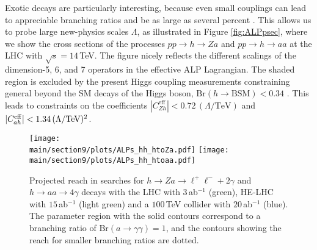 Exotic decays are particularly interesting, because even small couplings can lead to appreciable branching ratios and be as large as several percent \cite{Bauer:2017nlg, Bauer:2017ris}. 
This allows us to probe large new-physics scales $\Lambda$, as illustrated in Figure \ref{fig:ALPpsec}, where we show the cross sections of the processes $pp \to h \to Z a$ and $pp \to h \to aa$  at the LHC with $\sqrt{s} = 14\,$TeV. The figure nicely reflects the different scalings of the dimension-5, 6, and 7 operators in the effective ALP Lagrangian. The 
shaded region is excluded by the present Higgs coupling measurements constraining general beyond the SM decays of the Higgs boson, $\text{Br}(h\to\text{BSM})<0.34$ 
\cite{Khachatryan:2016vau}. This leads to constraints on the coefficients $|C_{Zh}^{\textrm{eff}}| < 0.72\,(\Lambda/\textrm{TeV})$ and $|C_{ah}^{\rm eff}| < 1.34\,(\Lambda/\textrm{TeV})^2$. 


%
\begin{figure}[t]
\begin{center}
\texttt{[image: \\main/section9/plots/ALPs\_hh\_htoZa.pdf]}
\texttt{[image: \\main/section9/plots/ALPs\_hh\_htoaa.pdf]}
\end{center}
\vspace{-0mm}
\caption{\label{fig:pphZa} Projected reach in searches for $h \to Za \to \ell^+\ell^-+2\gamma $ and $h \to aa \to 4\gamma $ decays with the LHC with $3$\,ab$^{-1}$
(green), HE-LHC with $15$\,ab$^{-1}$ (light green) and a $100\,$TeV collider with $20$\,ab$^{-1}$ (blue). The parameter region with the solid contours correspond to a branching ratio of $\text{Br}(a\to 
\gamma\gamma)=1$, and the contours showing the reach for smaller branching ratios are dotted.}
\end{figure}
%


